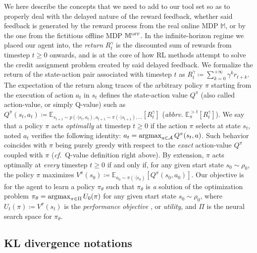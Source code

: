 We here describe the concepts that we need to add to our tool set so as to properly deal with the
delayed nature of the reward feedback, whether said feedback is generated by the reward process from the
real online MDP $\mathbb{M}$, or by the one from the fictitious offline MDP $\mathbb{M}^\textsc{off}$.
In the infinite-horizon regime we placed our agent into, the \emph{return}
$R_t^\gamma$ is
the discounted sum of rewards from timestep $t \geq 0$ onwards, and is at the core of how RL methods
attempt to solve the credit assignment problem created by said delayed feedback. We formalize the return
of the state-action pair associated with timestep $t$ as
$R_t^\gamma \coloneqq \sum_{k=0}^{+\infty} \gamma^k r_{t+k}$.
The expectation of the return along traces of the arbitrary policy $\pi$ starting from the execution of
action $a_t$ in $s_t$ defines the state-action value $Q^\pi$ (also called action-value, or simply Q-value)
such as
$Q^\pi(s_t, a_t) \coloneqq
\mathbb{E}_{
s_{t+1} \sim p(\cdot | s_t, a_t),
a_{t+1} \sim \pi(\cdot | s_{t+1}), \ldots}
[R_t^\gamma]$
(\textit{abbrv.} $\mathbb{E}_\pi^{>t}[R_t^\gamma]$).
We say that a policy $\pi$ acts \textit{optimally}
at timestep $t \geq 0$ if the action $\pi$ selects at
state $s_t$, noted $a_t$ verifies the following identity:
$a_t = \operatorname*{\arg\!\max}_{a \in \mathcal{A}} Q^\pi (s_t, a)$.
Such behavior coincides with $\pi$ being purely greedy with respect to the \textit{exact}
action-value $Q^\pi$  coupled with $\pi$ (\textit{cf.}~Q-value definition right above).
By extension, $\pi$ acts optimally at \emph{every} timestep $t \geq 0$ if and only if,
for any given start state $s_0 \sim \rho_0$, the policy $\pi$ maximizes
$V^\pi (s_0) \coloneqq \mathbb{E}_{a_0 \sim \pi(\cdot | s_0)}[Q^\pi(s_0, a_0)]$.
Our objective is for the agent to learn a policy $\pi_\theta$ such that $\pi_\theta$
is \emph{a} solution of the optimization problem
$\pi_\theta = \operatorname*{\arg\!\max}_{\pi \in \Pi} U_0(\pi)$
for any given start state $s_0 \sim \rho_0$,
where $U_t(\pi) \coloneqq V^\pi(s_t)$ is the \emph{performance objective} \cite{Silver2014-dk},
or \emph{utility},
and $\Pi$ is the neural search space for $\pi_\theta$.

\subsection*{KL divergence notations}

